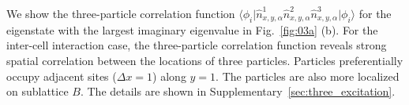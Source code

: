 \documentclass[longbibliography, aps, prx, amsmath, amssymb, amsfonts, twocolumn,superscriptaddress, footinbib]{revtex4-1}
\begin{document}
	We show the three-particle correlation function $\langle \phi_i \vert \hat{n}^1_{x,y,\alpha} \hat{n}^2_{x,y,\alpha} \hat{n}^3_{x,y,\alpha} \vert \phi_i \rangle$ for the eigenstate with the largest imaginary eigenvalue in Fig.~\ref{fig:03a} (b). 
	For the inter-cell interaction case, the three-particle correlation function reveals strong spatial correlation between the locations of three particles. Particles preferentially occupy adjacent sites ($\Delta x =1$) along $y=1$. The particles are also more localized on sublattice $B$. The details are shown in Supplementary~\ref{sec:three_excitation}.
\end{document}
